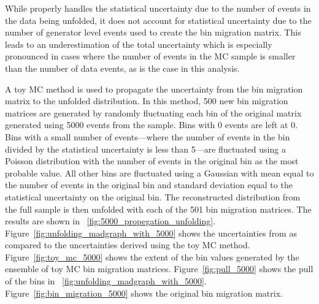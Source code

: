 While \RooUnfold properly handles the statistical uncertainty due to the number
of events in the data being unfolded, it does not account for statistical
uncertainty due to the number of generator level events used to create the
bin migration matrix. This leads to an underestimation of the total uncertainty
which is especially pronounced in cases where the number of events in the
MC sample is smaller than the number of data events, as is the case in this
analysis.

A toy MC method is used to propagate the uncertainty from the bin migration
matrix to the unfolded distribution. In this method, \num{500} new bin
migration matrices are generated by randomly fluctuating each bin of the
original matrix generated using \num{5000} events from the \POWHEG sample. Bins
with \num{0} events are left at \num{0}. Bins with a small number of
events---where the number of events in the bin divided by the statistical
uncertainty is less than \num{5}---are fluctuated using a Poisson distribution
with the number of events in the original bin as the most probable value. All
other bins are fluctuated using a Gaussian with mean equal to the number of
events in the original bin and standard deviation equal to the statistical
uncertainty on the original bin. The reconstructed \phistar distribution from
the full \MADGRAPH sample is then unfolded with each of the \num{501} bin
migration matrices. The results are shown in
\FIG~\ref{fig:5000_propegation_unfolding}.
Figure~\ref{fig:unfolding_madgraph_with_5000} shows the uncertainties from
\RooUnfold as compared to the uncertainties derived using the toy MC method.
Figure~\ref{fig:toy_mc_5000} shows the extent of the \phistar bin values
generated by the ensemble of toy MC bin migration matrices.
Figure~\ref{fig:pull_5000} shows the pull of the bins in
\FIG~\ref{fig:unfolding_madgraph_with_5000}.
Figure~\ref{fig:bin_migration_5000} shows the original bin migration matrix.

